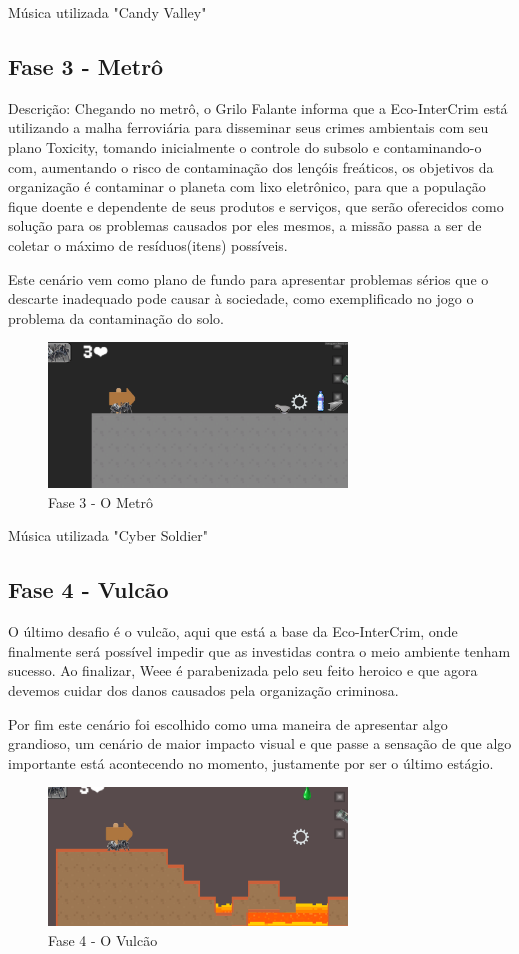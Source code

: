 Música utilizada "Candy Valley" \cite{CandyValley}

\subsection{Fase 3 - Metrô}
Descrição: Chegando no metrô, o Grilo Falante informa que a Eco-InterCrim está utilizando a malha ferroviária para disseminar seus crimes ambientais com seu plano Toxicity, tomando inicialmente o controle do subsolo e contaminando-o com, aumentando o risco de contaminação dos lençóis freáticos, os objetivos da organização é contaminar o planeta com lixo eletrônico, para que a população fique doente e dependente de seus produtos e serviços, que serão oferecidos como solução para os problemas causados por eles mesmos, a missão passa a ser de coletar o máximo de resíduos(itens) possíveis. 

Este cenário vem como plano de fundo para apresentar problemas sérios que o descarte inadequado pode causar à sociedade, como exemplificado no jogo o problema da contaminação do solo.
\begin{figure}[h]
    \centering
    \includegraphics[width=300px]{figuras/metro.png}
    \caption{Fase 3 - O Metrô}
    \label{fig_metro}
\end{figure}

Música utilizada "Cyber Soldier" \cite{CyberSoldier}
\pagebreak

\subsection{Fase 4 - Vulcão}
O último desafio é o vulcão, aqui que está a base da Eco-InterCrim, onde finalmente será possível impedir que as investidas contra o meio ambiente tenham sucesso. Ao finalizar, Weee é parabenizada pelo seu feito heroico e que agora devemos cuidar dos danos causados pela organização criminosa.

Por fim este cenário foi escolhido como uma maneira de apresentar algo grandioso, um cenário de maior impacto visual e que passe a sensação de que algo importante está acontecendo no momento, justamente por ser o último estágio.
\begin{figure}[hbt!]
    \centering
    \includegraphics[width=300px]{figuras/vulcao.png}
    \caption{Fase 4 - O Vulcão}
    \label{fig_vulcao}
\end{figure}

